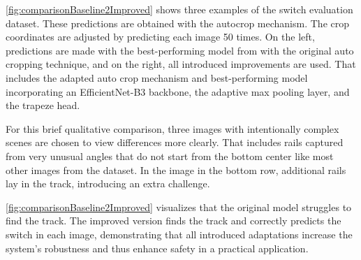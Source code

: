 \autoref{fig:comparisonBaseline2Improved} shows three examples of the switch evaluation dataset.
These predictions are obtained with the autocrop mechanism.
The crop coordinates are adjusted by predicting each image 50 times.
On the left, predictions are made with the best-performing model from \cite{tepNet2024} with the original auto cropping technique, and on the right, all introduced improvements are used.
That includes the adapted auto crop mechanism and best-performing model incorporating an EfficientNet-B3 backbone, the adaptive max pooling layer, and the trapeze head.

For this brief qualitative comparison, three images with intentionally complex scenes are chosen to view differences more clearly.
That includes rails captured from very unusual angles that do not start from the bottom center like most other images from the dataset.
In the image in the bottom row, additional rails lay in the track, introducing an extra challenge.

\autoref{fig:comparisonBaseline2Improved} visualizes that the original model \cite{tepNet2024} struggles to find the track.
The improved version finds the track and correctly predicts the switch in each image, demonstrating that all introduced adaptations increase the system's robustness and thus enhance safety in a practical application.
